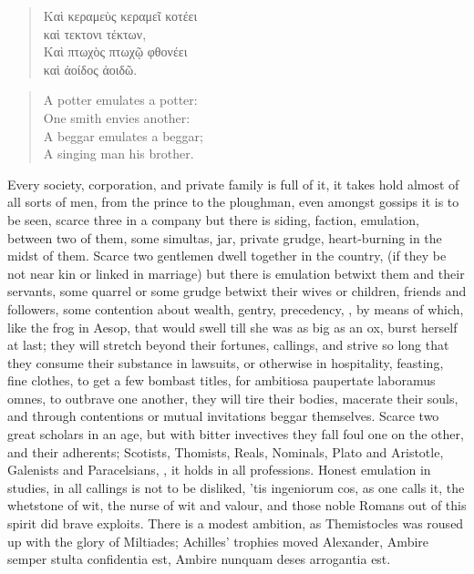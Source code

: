 {\begin{verse}
\textgreek[variant=ancient]{Καὶ κεραμεὺς κεραμεῖ κοτέει\\
καὶ τεκτονι τέκτων},\\
\textgreek[variant=ancient]{Καὶ πτωχὸς πτωχῷ φθονέει\\
καὶ ἀοίδος ἀοιδῶ.}
\end{verse}

\begin{verse}
A potter emulates a potter:\\
One smith envies another:\\

A beggar emulates a beggar;\\
A singing man his brother.\\
\end{verse}

Every society, corporation, and private family is full of it, it takes
hold almost of all sorts of men, from the prince to the ploughman, even
amongst gossips it is to be seen, scarce three in a company but there
is siding, faction, emulation, between two of them, some simultas, jar,
private grudge, heart-burning in the midst of them. Scarce two
gentlemen dwell together in the country, (if they be not near kin or
linked in marriage) but there is emulation betwixt them and their
servants, some quarrel or some grudge betwixt their wives or children,
friends and followers, some contention about wealth, gentry,
precedency, \etc{}, by means of which, like the frog in Aesop, that
would swell till she was as big as an ox, burst herself at last; they
will stretch beyond their fortunes, callings, and strive so long that
they consume their substance in lawsuits, or otherwise in hospitality,
feasting, fine clothes, to get a few bombast titles, for ambitiosa
paupertate laboramus omnes, to outbrave one another, they will tire
their bodies, macerate their souls, and through contentions or mutual
invitations beggar themselves. Scarce two great scholars in an age, but
with bitter invectives they fall foul one on the other, and their
adherents; Scotists, Thomists, Reals, Nominals, Plato and Aristotle,
Galenists and Paracelsians, \etc{}, it holds in all professions.
Honest emulation in studies, in all callings is not to be
disliked, 'tis ingeniorum cos, as one calls it, the whetstone of wit,
the nurse of wit and valour, and those noble Romans out of this spirit
did brave exploits. There is a modest ambition, as Themistocles was
roused up with the glory of Miltiades; Achilles' trophies moved
Alexander,
Ambire semper stulta confidentia est,
Ambire nunquam deses arrogantia est.

}
